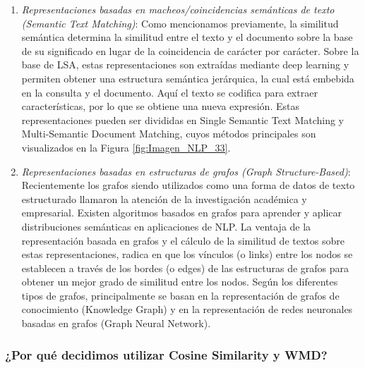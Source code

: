 \documentclass[12pt,a4paper]{article}
\begin{document}
\begin{sloppypar}
\begin{enumerate}
\item \textit{Representaciones basadas en macheos/coincidencias semánticas de texto (Semantic Text Matching)}: Como mencionamos previamente, la similitud semántica determina la similitud entre el texto y el documento sobre la base de su significado en lugar de la coincidencia de carácter por carácter. Sobre la base de LSA, estas representaciones son extraídas mediante deep learning y permiten obtener una estructura semántica jerárquica, la cual está embebida en la consulta y el documento. Aquí el texto se codifica para extraer características, por lo que se obtiene una nueva expresión. Estas representaciones pueden ser divididas en Single Semantic Text Matching y Multi-Semantic Document Matching, cuyos métodos principales son visualizados en la Figura \ref{fig:Imagen_NLP_33}.

\item \textit{Representaciones basadas en estructuras de grafos (Graph Structure-Based)}: Recientemente los grafos siendo utilizados como una forma de datos de texto estructurado llamaron la atención de la investigación académica y empresarial. Existen algoritmos basados en grafos para aprender y aplicar distribuciones semánticas en aplicaciones de NLP. La ventaja de la representación basada en grafos y el cálculo de la similitud de textos sobre estas representaciones, radica en que los vínculos (o links) entre los nodos se establecen a través de los bordes (o edges) de las estructuras de grafos para obtener un mejor grado de similitud entre los nodos. Según los diferentes tipos de grafos, principalmente se basan en la representación de grafos de conocimiento (Knowledge Graph) y en la representación de redes neuronales basadas en grafos (Graph Neural Network).
\\
\end{enumerate}

\subsubsection{¿Por qué decidimos utilizar Cosine Similarity y WMD?}\label{cos_y_wmd}


\end{sloppypar}
\end{document}

